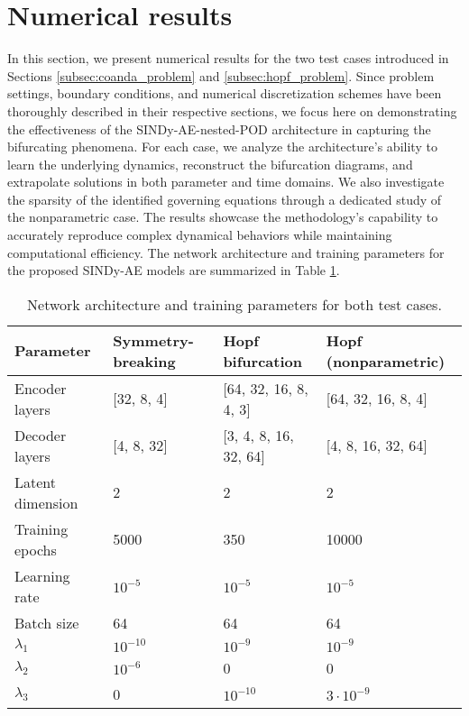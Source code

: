 \documentclass[reqno]{amsart}[standalone]
\theoremstyle{definition}
\theoremstyle{remark}
\begin{document}
\section{Numerical results}\label{sec:numerical}
In this section, we present numerical results for the two test cases introduced in Sections \ref{subsec:coanda_problem} and \ref{subsec:hopf_problem}. Since problem settings, boundary conditions, and numerical discretization schemes have been thoroughly described in their respective sections, we focus here on demonstrating the effectiveness of the SINDy-AE-nested-POD architecture in capturing the bifurcating phenomena. For each case, we analyze the architecture's ability to learn the underlying dynamics, reconstruct the bifurcation diagrams, and extrapolate solutions in both parameter and time domains. We also investigate the sparsity of the identified governing equations through a dedicated study of the nonparametric case. The results showcase the methodology's capability to accurately reproduce complex dynamical behaviors while maintaining computational efficiency.
The network architecture and training parameters for the proposed SINDy-AE models are summarized in Table \ref{tab:network_params}.

\begin{table}[htbp]
    \centering
    \begin{tabular}{llll}
        \hline
        Parameter & Symmetry-breaking & Hopf bifurcation & Hopf (nonparametric) \\
        \hline
        Encoder layers & [32, 8, 4] & [64, 32, 16, 8, 4, 3] & [64, 32, 16, 8, 4] \\
        Decoder layers & [4, 8, 32] & [3, 4, 8, 16, 32, 64] & [4, 8, 16, 32, 64] \\
        Latent dimension & 2 & 2 & 2 \\
        Training epochs & 5000 & 350 & 10000 \\
        Learning rate & $10^{-5}$ & $10^{-5}$ & $10^{-5}$ \\
        Batch size & 64 & 64 & 64 \\
        $\lambda_1$ & $10^{-10}$ & $10^{-9}$ & $10^{-9}$ \\
        $\lambda_2$ & $10^{-6}$ & 0 & 0 \\
        $\lambda_3$ & 0 & $10^{-10}$ & $3\cdot 10^{-9}$ \\
        \hline
    \end{tabular}
    \caption{Network architecture and training parameters for both test cases.}
    \label{tab:network_params}
\end{table}
\end{document}
